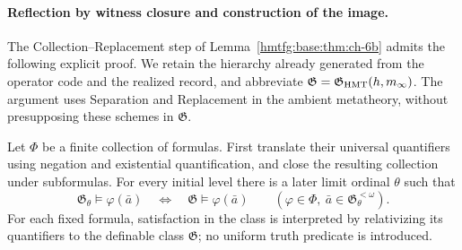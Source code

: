 \paragraph{Reflection by witness closure and construction of the image.}
The Collection--Replacement step of Lemma~\ref{hmtfg:base:thm:ch-6b} admits the following
explicit proof. We retain the hierarchy already generated from the operator
code and the realized record, and abbreviate
\(\mathfrak G=\mathfrak G_{\rm HMT}(h,m_\infty)\).
The argument uses Separation and Replacement in the ambient metatheory,
without presupposing these schemes in \(\mathfrak G\).

Let \(\Phi\) be a finite collection of formulas. First translate their
universal quantifiers using negation and existential quantification, and
close the resulting collection under subformulas. For every initial level
there is a later limit ordinal \(\theta\) such that
\[
 \mathfrak G_\theta\models\varphi(\bar a)
 \quad\Longleftrightarrow\quad
 \mathfrak G\models\varphi(\bar a)
 \qquad
 (\varphi\in\Phi,\ \bar a\in\mathfrak G_\theta^{<\omega}).
\]
For each fixed formula, satisfaction in the class is interpreted by
relativizing its quantifiers to the definable class \(\mathfrak G\);
no uniform truth predicate is introduced.


